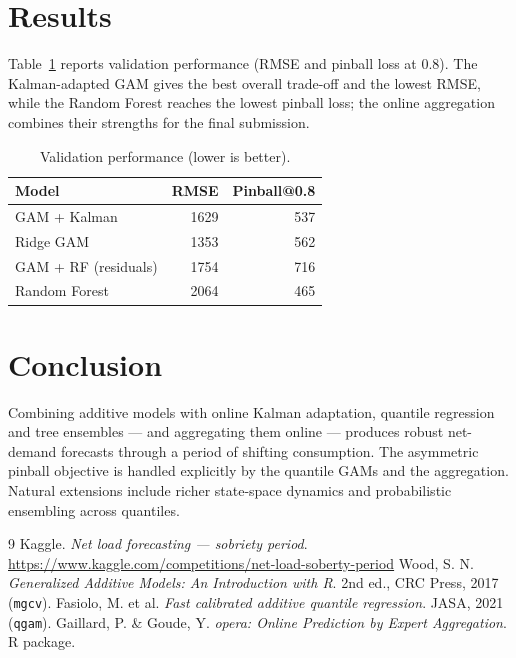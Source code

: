\documentclass[11pt,a4paper]{article}
\begin{document}
\section{Results}
Table~\ref{tab:results} reports validation performance (RMSE and pinball loss at
$0.8$). The Kalman-adapted GAM gives the best overall trade-off and the lowest RMSE,
while the Random Forest reaches the lowest pinball loss; the online aggregation
combines their strengths for the final submission.

\begin{table}[h]
\centering
\begin{tabular}{lrr}
\toprule
\textbf{Model} & \textbf{RMSE} & \textbf{Pinball@0.8} \\
\midrule
GAM + Kalman              & 1629 & 537 \\
Ridge GAM                 & 1353 & 562 \\
GAM + RF (residuals)      & 1754 & 716 \\
Random Forest             & 2064 & 465 \\
\bottomrule
\end{tabular}
\caption{Validation performance (lower is better).}
\label{tab:results}
\end{table}

\section{Conclusion}
Combining additive models with online Kalman adaptation, quantile regression and tree
ensembles --- and aggregating them online --- produces robust net-demand forecasts
through a period of shifting consumption. The asymmetric pinball objective is handled
explicitly by the quantile GAMs and the aggregation. Natural extensions include richer
state-space dynamics and probabilistic ensembling across quantiles.

\begin{thebibliography}{9}
 Kaggle. \emph{Net load forecasting --- sobriety period}.
\url{https://www.kaggle.com/competitions/net-load-soberty-period}
 Wood, S. N. \emph{Generalized Additive Models: An Introduction with R}.
2nd ed., CRC Press, 2017 (\texttt{mgcv}).
 Fasiolo, M. et al. \emph{Fast calibrated additive quantile regression}.
JASA, 2021 (\texttt{qgam}).
 Gaillard, P. \& Goude, Y. \emph{opera: Online Prediction by Expert
Aggregation}. R package.
\end{thebibliography}
\end{document}
